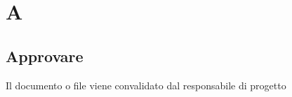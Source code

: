 \section{A}
\subsection{Approvare}%
Il documento o file viene convalidato dal responsabile di progetto
\clearpage 